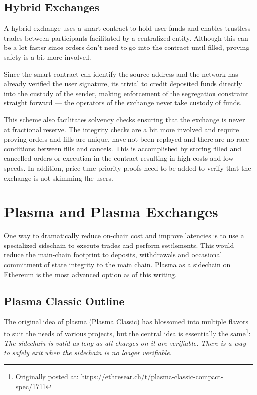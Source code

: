 \documentclass[12pt,a4paper]{article}
\begin{document}
\subsection{Hybrid Exchanges}
A hybrid exchange uses a smart contract to hold user funds and enables trustless trades between participants facilitated by a centralized entity. Although this can be a lot faster since orders don’t need to go into the contract until filled, proving safety is a bit more involved\cite{levprotocol}. 

Since the smart contract can identify the source address and the network has already verified the user signature, its trivial to credit deposited funds directly into the custody of the sender, making enforcement of the segregation constraint straight forward --- the operators of the exchange never take custody of funds. 

This scheme also facilitates solvency checks ensuring that the exchange is never at fractional reserve. The integrity checks are a bit more involved and require proving orders and fills are unique, have not been replayed and there are no race conditions between fills and cancels. This is accomplished by storing filled and cancelled orders or execution in the contract resulting in high costs and low speeds\cite{WA17}. In addition, price-time priority proofs need to be added to verify that the exchange is not skimming the users.

\section{Plasma and Plasma Exchanges}
One way to dramatically reduce on-chain cost and improve latencies is to use a specialized sidechain to execute trades and perform settlements. This would reduce the main-chain footprint to deposits, withdrawals and occasional commitment of state integrity to the main chain. Plasma as a sidechain on Ethereum is the most advanced option as of this writing.

\subsection{Plasma Classic Outline}
The original idea of plasma (Plasma Classic) has blossomed into multiple flavors to suit the needs of various projects, but the central idea is essentially the same\footnote{Originally posted at: \url{https://ethresear.ch/t/plasma-classic-compact-spec/1711}}: \emph{The sidechain is valid as long as all changes on it are verifiable. There is a way to safely exit when the sidechain is no longer verifiable}.
\end{document}
